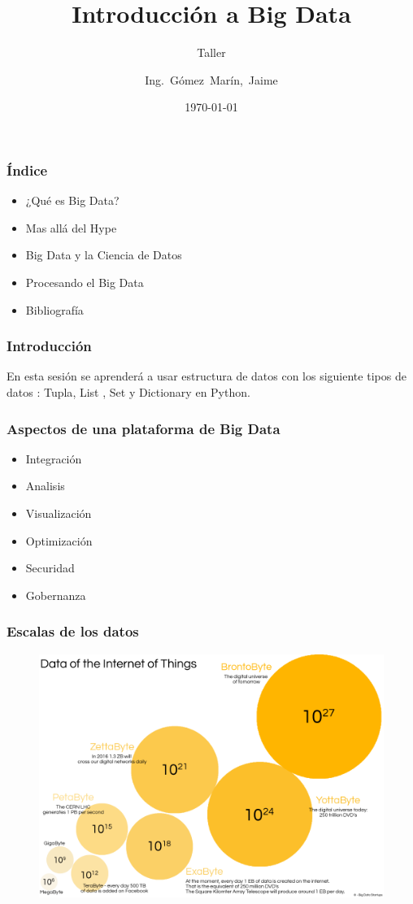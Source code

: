 \documentclass{beamer}
\title[Introducci\'on a Big Data] %
{ Introducci\'on a Big Data }
\subtitle{Taller}
\author[JGM] %
{Ing.~Gómez~Marín,~Jaime}
\institute[TECSUP] %
{
  
    Departamento de TdG
}
\date{\today}
\begin{document}
\begin{frame}
\titlepage
\end{frame}

\begin{frame}
\frametitle{\'Indice}
\begin{itemize}
\item ¿Qu\'e es Big Data?
\item Mas allá del Hype
\item Big Data y la Ciencia de Datos
\item Procesando el Big Data
\item Bibliograf\'ia
\end{itemize}
\end{frame}

\begin{frame}
\frametitle{Introducci\'on}
 
En esta sesi\'on se aprender\'a a usar  estructura de datos con los siguiente tipos de datos : 
\alert{Tupla}, \alert{List} , \alert{Set} y \alert{Dictionary} en Python.

\end{frame}

\begin{frame}
\frametitle{Aspectos de una plataforma de Big Data }

\begin{itemize}
\item Integraci\'on 
\item Analisis
\item Visualizaci\'on
\item Optimizaci\'on
\item Securidad
\item Gobernanza
\end{itemize}

\end{frame}

\begin{frame}
\frametitle{Escalas de los datos}
\begin{figure}
\includegraphics[scale=0.26]{img/2_Hyper}
\end{figure}
\end{frame}
\end{document}
